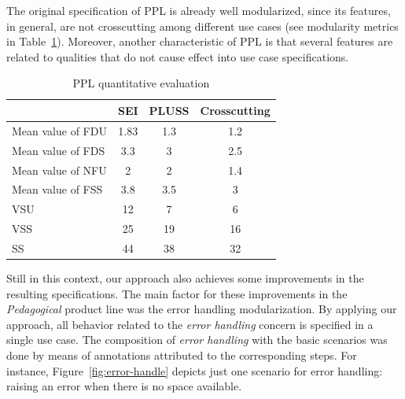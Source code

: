 \documentclass{acm_proc_article-sp}
\begin{document}
The original specification of PPL is already well modularized, since its features, in general, are not crosscutting among different use cases (see modularity metrics in Table~\ref{tab:ppl-metrics}). Moreover, another characteristic of PPL is that several features are related to qualities that do not cause effect into use case specifications. 

\begin{table}[hb]
\centering
\caption{PPL quantitative evaluation}
\label{tab:ppl-metrics}
\begin{small}
\begin{tabular}{lccc} \hline
					& SEI 	& PLUSS 	& Crosscutting	\\ \hline
Mean value of FDU 		& 1.83	& 1.3	& 1.2	\\
Mean value of FDS 		& 3.3	& 3		& 2.5	\\
Mean value of NFU 		& 2		& 2		& 1.4	\\
Mean value of FSS 		& 3.8	& 3.5	& 3		\\ 
VSU 					& 12		& 7		& 6		\\
VSS 					& 25		& 19		& 16		\\
SS 					& 44		& 38		& 32		\\	\hline
\end{tabular}
\end{small}
\end{table}

Still in this context, our approach also achieves some improvements in the resulting specifications. The main factor for these improvements in the \emph{Pedagogical} product line was the error handling modularization. By applying our approach, all behavior related to the \emph{error handling} concern is specified in a single use case. The composition of \emph{error handling} with the basic scenarios was done by means of annotations attributed to the corresponding steps. For instance, Figure~\ref{fig:error-handle} depicts just one scenario for error handling: raising  an error when there is no space available. 
\end{document}
